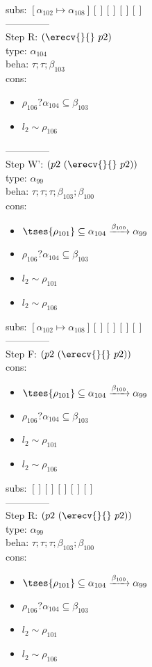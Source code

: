 \documentclass[12pt]{article}
\begin{document}
 subs:  $ [ \alpha_{102}\mapsto\alpha_{108}] [] [] [] [] $ 
  \\--------------\\ 
Step R: $ (\erecv{}{}~p2) $\\
  type: $ \alpha_{104} $ 
\\  beha: $ \tau; \tau; \beta_{103} $ 
\\  cons: \begin{itemize}
\item $ \rho_{106}?\alpha_{104} \subseteq \beta_{103} $
\item $ l_{2} \sim\rho_{106} $
\end{itemize} 
  --------------\\ 
Step W': $ (p2~(\erecv{}{}~p2)) $\\
  type: $ \alpha_{99} $ 
\\  beha: $ \tau; \tau; \tau; \beta_{103}; \beta_{100} $ 
\\  cons: \begin{itemize}
\item $  \tses{ \rho_{101}} \subseteq \alpha_{104} \xrightarrow{\beta_{100}} \alpha_{99} $
\item $ \rho_{106}?\alpha_{104} \subseteq \beta_{103} $
\item $ l_{2} \sim\rho_{101} $
\item $ l_{2} \sim\rho_{106} $
\end{itemize} 
  subs:  $ [ \alpha_{102}\mapsto\alpha_{108}] [] [] [] [] $  
 \\--------------\\ 
Step F: $ (p2~(\erecv{}{}~p2)) $
 \\ cons: \begin{itemize}
\item $  \tses{ \rho_{101}} \subseteq \alpha_{104} \xrightarrow{\beta_{100}} \alpha_{99} $
\item $ \rho_{106}?\alpha_{104} \subseteq \beta_{103} $
\item $ l_{2} \sim\rho_{101} $
\item $ l_{2} \sim\rho_{106} $
\end{itemize}
 subs:  $ [ ] [] [] [] [] $ 
  \\--------------\\ 
Step R: $ (p2~(\erecv{}{}~p2)) $\\
  type: $ \alpha_{99} $ 
\\  beha: $ \tau; \tau; \tau; \beta_{103}; \beta_{100} $ 
\\  cons: \begin{itemize}
\item $  \tses{ \rho_{101}} \subseteq \alpha_{104} \xrightarrow{\beta_{100}} \alpha_{99} $
\item $ \rho_{106}?\alpha_{104} \subseteq \beta_{103} $
\item $ l_{2} \sim\rho_{101} $
\item $ l_{2} \sim\rho_{106} $
\end{itemize} 
\end{document}
